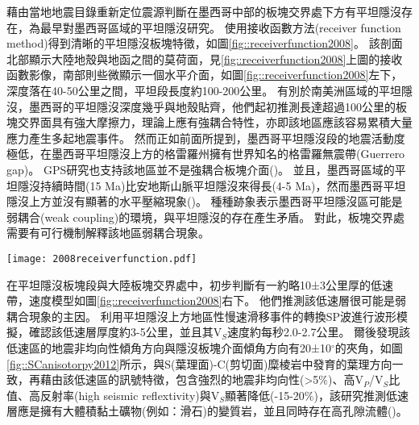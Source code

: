 \citet{pardo1995}藉由當地地震目錄重新定位震源判斷在墨西哥中部的板塊交界處下方有平坦隱沒存在，為最早對墨西哥區域的平坦隱沒研究。
\citet{PerezCampos2008}使用接收函數方法(receiver function method)得到清晰的平坦隱沒板塊特徵，如圖\ref{fig::receiverfunction2008}。
該剖面北部顯示大陸地殼與地函之間的莫荷面，見\ref{fig::receiverfunction2008}上圖的接收函數影像，南部則些微顯示一個水平介面，如圖\ref{fig::receiverfunction2008}左下，深度落在40-50公里之間，平坦段長度約100-200公里。
有別於南美洲區域的平坦隱沒，墨西哥的平坦隱沒深度幾乎與地殼貼齊，他們起初推測長達超過100公里的板塊交界面具有強大摩擦力，理論上應有強耦合特性，亦即該地區應該容易累積大量應力產生多起地震事件。
然而正如前面所提到，墨西哥平坦隱沒段的地震活動度極低，在墨西哥平坦隱沒上方的格雷羅州擁有世界知名的格雷羅無震帶(Guerrero gap)。
GPS研究也支持該地區並不是強耦合板塊介面(\citealp{nieto2006latest})。
並且，墨西哥區域的平坦隱沒持續時間(15 Ma)比安地斯山脈平坦隱沒來得長(4-5 Ma)，然而墨西哥平坦隱沒上方並沒有顯著的水平壓縮現象(\citealp{moran2007cenozoic})。
種種跡象表示墨西哥平坦隱沒區可能是弱耦合(weak coupling)的環境，與平坦隱沒的存在產生矛盾。
對此，板塊交界處需要有可行機制解釋該地區弱耦合現象。

\begin{figure*}[ht!]
    \centering
    \texttt{[image: 2008receiverfunction.pdf]}
    \caption[墨西哥平坦隱沒區域接收函數結果，摘自\citet{PerezCampos2008}]{墨西哥平坦隱沒區域接收函數結果，摘自\citet{PerezCampos2008}。
    (a)中黑色三角形表示測站沿剖面的位置，高程被放大10倍。
    粗棕色線表示跨墨西哥火山帶(TMVB, Trans-Mexican Volcanic Belt)的範圍。
    接收函數影像中標出沿剖面50公里範圍內的震源(粉紅色點來自SSN地震目錄，綠色點來自\citet{pardo1995}重新定位結果)位置。
    (b)顯示沿平坦隱沒板塊的一次遠震事件的接收函數。
    (c)說明了相應的模型(LVM (low velocity mantle) = 低速地函和 OC (oceanic crust) = 海洋地殼)。
    (d)根據左下圖接收函數模型中A、B和C位置上的P波速度模型。
    }
    \label{fig::receiverfunction2008}
\end{figure*}

\citet{PerezCampos2008}在平坦隱沒板塊段與大陸板塊交界處中，初步判斷有一約略10±3公里厚的低速帶，速度模型如圖\ref{fig::receiverfunction2008}右下。
他們推測該低速層很可能是弱耦合現象的主因。
\citet{Song2009}利用平坦隱沒上方地區性慢速滑移事件的轉換SP波進行波形模擬，確認該低速層厚度約3-5公里，並且其V$_S$速度約每秒2.0-2.7公里。
爾後\citet{Song2012SC}發現該低速區的地震非均向性傾角方向與隱沒板塊介面傾角方向有20±10$^{\circ}$的夾角，如圖\ref{fig::SCanisotorpy2012}所示，與S(葉理面)-C(剪切面)糜棱岩中發育的葉理方向一致，再藉由該低速區的訊號特徵，包含強烈的地震非均向性(>5$\%$)、高V$_P$/V$_S$比值、高反射率(high seismic reflextivity)與V$_S$顯著降低(-15-20$\%$)，該研究推測低速層應是擁有大體積黏土礦物(例如：滑石)的變質岩，並且同時存在高孔隙流體(\citealp{Kim2012})。

